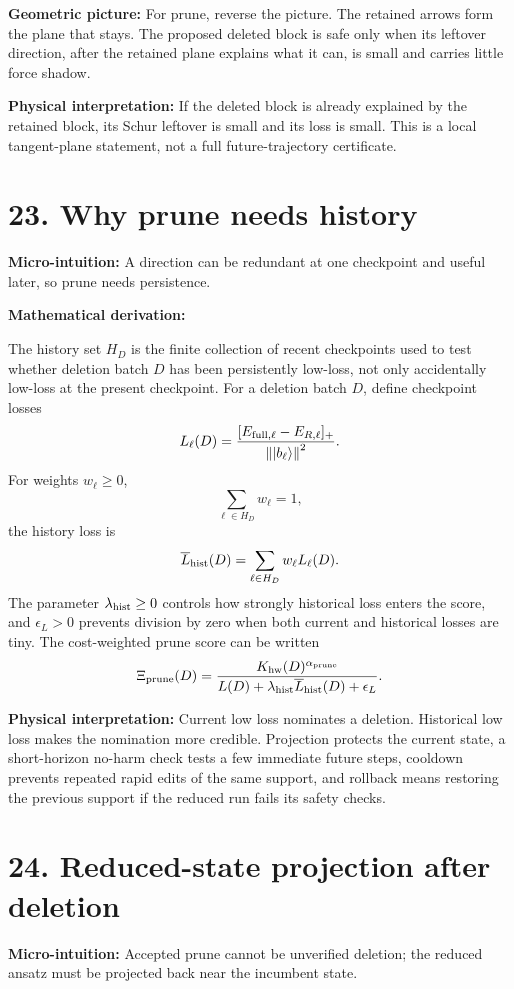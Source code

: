 \documentclass[10pt,twocolumn]{article}
\newcommand{\ket}[1]{\left|#1\right\rangle}
\newcommand{\norm}[1]{\left\lVert #1\right\rVert}
\newcommand{\micro}[1]{%
  \par\smallskip
  \noindent\textcolor{deepblue}{\textbf{Micro-intuition:}} #1
  \par\smallskip}
\newcommand{\deriv}{%
  \par\noindent\textcolor{deepviolet}{\textbf{Mathematical derivation:}}\par\vspace{-1mm}}
\newcommand{\phys}[1]{%
  \par\smallskip
  \noindent\textcolor{deepgreen}{\textbf{Physical interpretation:}} #1
  \par\smallskip}
\newcommand{\geom}[1]{%
  \par\smallskip
  \noindent\textcolor{deepviolet}{\textbf{Geometric picture:}} #1
  \par\smallskip}
\begin{document}
\geom{For prune, reverse the picture. The retained arrows form the plane that
stays. The proposed deleted block is safe only when its leftover direction,
after the retained plane explains what it can, is small and carries little
force shadow.}

\phys{If the deleted block is already explained by the retained block, its
Schur leftover is small and its loss is small. This is a local tangent-plane
statement, not a full future-trajectory certificate.}

\section*{23. Why prune needs history}

\micro{A direction can be redundant at one checkpoint and useful later, so prune
needs persistence.}

\deriv
The history set \(H_D\) is the finite collection of recent checkpoints used to
test whether deletion batch \(D\) has been persistently low-loss, not only
accidentally low-loss at the present checkpoint. For a deletion batch \(D\),
define checkpoint losses
\[
L_\ell(D)
=
\frac{[E_{\rm full,\ell}-E_{R,\ell}]_+}{\norm{\ket{b_\ell}}^2}.
\]
For weights \(w_\ell\ge0\),
\[
\sum_{\ell\in H_D}w_\ell=1,
\]
the history loss is
\[
\overline L_{\rm hist}(D)
=
\sum_{\ell\in H_D}w_\ell L_\ell(D).
\]
The parameter \(\lambda_{\rm hist}\ge0\) controls how strongly historical loss
enters the score, and \(\epsilon_L>0\) prevents division by zero when both
current and historical losses are tiny. The cost-weighted prune score can be
written
\[
\Xi_{\rm prune}(D)
=
\frac{K_{\rm hw}(D)^{\alpha_{\rm prune}}}
{L(D)+\lambda_{\rm hist}\overline L_{\rm hist}(D)+\epsilon_L}.
\]

\phys{Current low loss nominates a deletion. Historical low loss makes the
nomination more credible. Projection protects the current state, a short-horizon
no-harm check tests a few immediate future steps, cooldown prevents repeated
rapid edits of the same support, and rollback means restoring the previous
support if the reduced run fails its safety checks.}

\section*{24. Reduced-state projection after deletion}

\micro{Accepted prune cannot be unverified deletion; the reduced ansatz must be
projected back near the incumbent state.}
\end{document}
